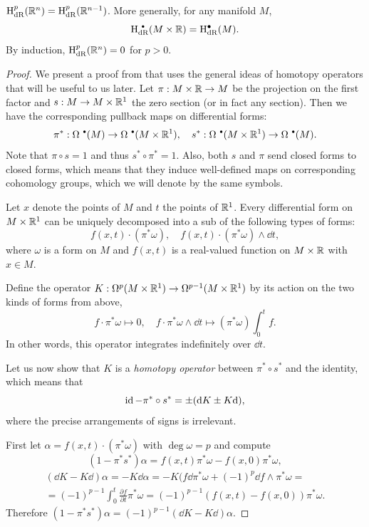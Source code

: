 \begin{thm}\label{Poincare lem}
    $\mathrm{H}^p_{\rm dR}(\mathbb{R}^{n})=\mathrm{H}^{p}_{\rm dR}(\mathbb{R}^{n-1})$. More generally, for any manifold $M$,
    \[\rmH^{\smbullet }_{\rm dR}(M\times\bbR)=\rmH^{\bullet}_{\rm dR}(M).\]
    By induction, $\mathrm{H}^p_{\rm dR}(\mathbb{R}^{n})=0$ for $p>0$.
\end{thm}
\begin{proof}
    We present a proof from \cite{BottTu} that uses the general ideas of homotopy operators that will be useful to us later. Let $\pi:M\times\mathbb{R} \to M$ be the projection on the first factor and $s:M\to M\times\mathbb{R}^1$ the zero section (or in fact any section). Then we have the corresponding pullback maps on differential forms:
    \[\pi^\ast:\Omega^{\smbullet }(M)\to \Omega^{\smbullet }(M\times\bbR^1),\quad s^\ast: \Omega^{\smbullet }(M\times\bbR^1)\to \Omega^{\smbullet }(M).\]
    Note that $\pi\circ s=1$ and thus $s^\ast\circ\pi^\ast=1$. Also, both $s$ and $\pi$ send closed forms to closed forms, which means that they induce well-defined maps on corresponding cohomology groups, which we will denote by the same symbols.
    
    Let $x$ denote the points of $M$ and $t$ the points of $\mathbb{R}^1$. Every differential form on $M\times\mathbb{R}^1$ can be uniquely decomposed into a sub of the following types of forms:
    \[f(x,t)\cdot (\pi^\ast\omega),\quad f(x,t)\cdot(\pi^\ast\omega)\wedge\dd t,\]
    where $\omega$ is a form on $M$ and $f(x,t)$ is a real-valued function on $M\times\mathbb{R}$ with $x\in M$.
    
    Define the operator $K:\Omega^p(M\times\mathbb{R}^1)\to \Omega^{p-1}(M\times\mathbb{R}^1)$ by its action on the two kinds of forms from above,
    \[f\cdot \pi^\ast \omega\mapsto 0,\quad f\cdot\pi^\ast \omega \wedge\dd t\mapsto (\pi^\ast\omega)\int_0^t f.\]
    In other words, this operator integrates indefinitely over $\dd t$.
    
    Let us now show that $K$ is a \emph{homotopy operator} between $\pi^\ast\circ s^\ast$ and the identity, which means that
    \[\operatorname{id}-\pi^\ast\circ s^\ast=\pm ({\mathrm{d}} K\pm K {\mathrm{d}}),\]
    where the precise arrangements of signs is irrelevant.
    
    First let $\alpha=f(x,t)\cdot (\pi^\ast\omega)$ with $\deg \omega=p$ and compute
    \[(1-\pi^\ast s^\ast)\alpha=f(x,t)\pi^\ast\omega-f(x,0)\pi^\ast\omega,\]
    \begin{multline}
        (\dd K-K \dd)\alpha=-K\dd\alpha=-K(f\dd\pi^\ast\omega+(-1)^p\dd f\wedge\pi^\ast\omega=\\=(-1)^{p-1}\int_0^t\frac{\partial f}{\partial t}\pi^\ast\omega=(-1)^{p-1}(f(x,t)-f(x,0))\pi^\ast\omega.
    \end{multline}
    Therefore $(1-\pi^\ast s^\ast)\alpha=(-1)^{p-1}(\dd K-K \dd)\alpha$.
    

\end{proof}
